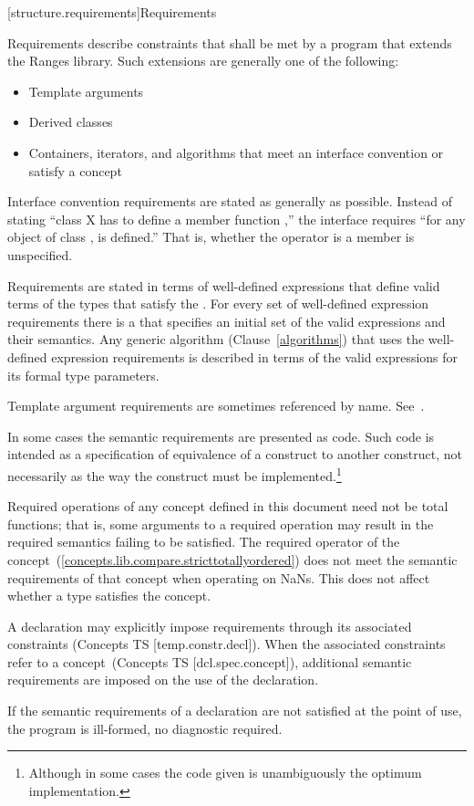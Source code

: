 [structure.requirements]{Requirements}

\pnum
{}%
Requirements describe constraints that shall be met by a \Cpp program that extends the Ranges library.
Such extensions are generally one of the following:

\begin{itemize}
\item Template arguments
\item Derived classes
\item Containers, iterators, and algorithms that meet an interface convention
or satisfy a concept
\end{itemize}

\pnum
Interface convention requirements are stated as generally as possible. Instead
of stating ``class X has to define a member function ,'' the
interface requires ``for any object  of class ,  is
defined.'' That is, whether the operator is a member is unspecified.

\pnum
Requirements are stated in terms of  well-defined expressions that define valid terms of
the types that satisfy the . For every set of
well-defined expression requirements there is a  that
specifies an initial set of the valid expressions and their semantics. Any generic
algorithm (Clause~\ref{algorithms}) that uses the well-defined expression requirements
is described in terms of the valid expressions for its formal type parameters. 

\pnum
Template argument requirements are sometimes referenced by name.
See~.

\pnum
In some cases the semantic requirements are presented as \Cpp code.
Such code is intended as a
specification of equivalence of a construct to another construct, not
necessarily as the way the construct
must be implemented.\footnote{Although in some cases the code given is
unambiguously the optimum implementation.}

\begin{addedblock}
\pnum
Required operations of any concept defined in this document need not be
total functions; that is, some arguments to a required operation may
result in the required semantics failing to be satisfied. \enterexample
The required \tcode{<} operator of the 
concept~(\ref{concepts.lib.compare.stricttotallyordered}) does not meet the
semantic requirements of that concept when operating on NaNs.\exitexample
This does not affect whether a type satisfies the concept.

\pnum
A declaration may explicitly impose requirements through its associated
constraints (Concepts TS [temp.constr.decl]). When the associated constraints
refer to a concept~(Concepts TS [dcl.spec.concept]), additional semantic requirements are
imposed on the use of the declaration.

\pnum
If the semantic requirements of a declaration are not satisfied at the
point of use, the program is ill-formed, no diagnostic required.
\end{addedblock}

